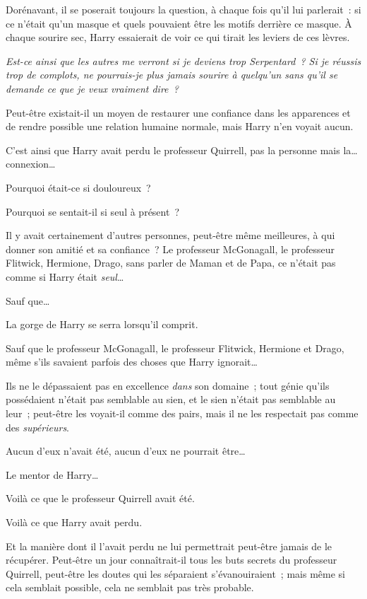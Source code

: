 Dorénavant, il se poserait toujours la question, à chaque fois qu'il lui parlerait~: si ce n'était qu'un masque et quels pouvaient être les motifs derrière ce masque. À chaque sourire sec, Harry essaierait de voir ce qui tirait les leviers de ces lèvres.

\emph{Est-ce ainsi que les autres me verront si je deviens trop Serpentard~? Si je réussis trop de complots, ne pourrais-je plus jamais sourire à quelqu'un sans qu'il se demande ce que je veux vraiment dire~?}

Peut-être existait-il un moyen de restaurer une confiance dans les apparences et de rendre possible une relation humaine normale, mais Harry n'en voyait aucun.

C'est ainsi que Harry avait perdu le professeur Quirrell, pas la personne mais la… connexion…

Pourquoi était-ce si douloureux~?

Pourquoi se sentait-il si seul à présent~?

Il y avait certainement d'autres personnes, peut-être même meilleures, à qui donner son amitié et sa confiance~? Le professeur McGonagall, le professeur Flitwick, Hermione, Drago, sans parler de Maman et de Papa, ce n'était pas comme si Harry était \emph{seul}…

Sauf que…

La gorge de Harry se serra lorsqu'il comprit.

Sauf que le professeur McGonagall, le professeur Flitwick, Hermione et Drago, même s'ils savaient parfois des choses que Harry ignorait…

Ils ne le dépassaient pas en excellence \emph{dans} son domaine~; tout génie qu'ils possédaient n'était pas semblable au sien, et le sien n'était pas semblable au leur~; peut-être les voyait-il comme des pairs, mais il ne les respectait pas comme des \emph{supérieurs}.

Aucun d'eux n'avait été, aucun d'eux ne pourrait être…

Le mentor de Harry…

Voilà ce que le professeur Quirrell avait été.

Voilà ce que Harry avait perdu.

Et la manière dont il l'avait perdu ne lui permettrait peut-être jamais de le récupérer. Peut-être un jour connaîtrait-il tous les buts secrets du professeur Quirrell, peut-être les doutes qui les séparaient s'évanouiraient~; mais même si cela semblait possible, cela ne semblait pas très probable.

